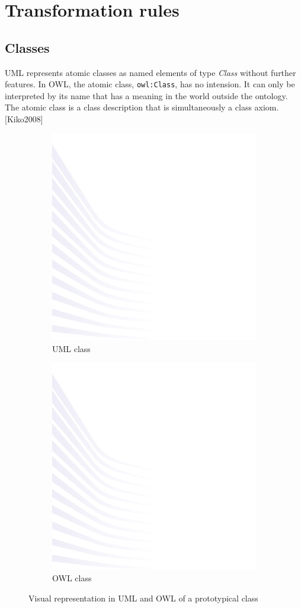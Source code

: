 \section{Transformation rules}
\label{sec:tran-rules}


\subsection{Classes}
\label{sec:classes}

UML represents atomic classes as named elements of type \textit{Class} without further features. In OWL, the atomic class, \texttt{owl:Class}, has no intension. It can only be interpreted by its name that has a meaning in the world outside the ontology. The atomic class is a class description that is simultaneously a class axiom. [Kiko2008]



\begin{figure}[!ht]
	\centering
	\begin{subfigure}{.5\textwidth}
		\centering
		\includegraphics[width=.45\linewidth]{images/background.png}
		\caption{UML class}
		\label{fig:class-uml}
	\end{subfigure}%
	\begin{subfigure}{.5\textwidth}
		\centering
		\includegraphics[width=.45\linewidth]{images/background.png}
		\caption{OWL class}
		\label{fig:class-owl}
	\end{subfigure}
	\caption{Visual representation in UML and OWL of a prototypical class }
	\label{fig:class}
\end{figure}

